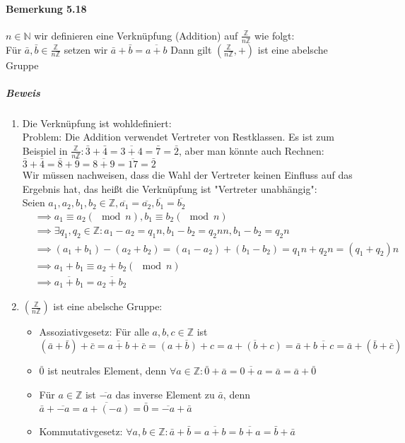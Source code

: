 \documentclass[a4paper]{scrartcl}
\DeclareMathOperator{\Forall}{\forall}
\theoremstyle{definition}
\theoremstyle{plain}
\theoremstyle{plain}
\theoremstyle{remark}
\theoremstyle{remark}
\theoremstyle{remark}
\theoremstyle{remark}
\theoremstyle{remark}
\begin{document}
\paragraph{Bemerkung 5.18}
\label{sec-3-1-7-4}
$n\in\mathbb{N}$ wir definieren eine Verknüpfung (Addition) auf $\frac{\mathbb{Z}}{n\mathbb{Z}}$ wie folgt: \\
     Für $\bar a,\bar b \in\frac{\mathbb{Z}}{n\mathbb{Z}}$ setzen wir $\bar a + \bar b = \overline{a + b}$
Dann gilt $(\frac{\mathbb{Z}}{n\mathbb{Z}},+)$ ist eine abelsche Gruppe
\subparagraph{Beweis}
\label{sec-3-1-7-4-1}
\begin{enumerate}
\item Die Verknüpfung ist wohldefiniert: \\ Problem: Die Addition verwendet Vertreter von Restklassen. Es ist zum Beispiel in $\frac{\mathbb{Z}}{n\mathbb{Z}}: \bar 3 + \bar 4 = \overline{3 + 4} = \bar 7 = \bar 2$, aber man könnte auch Rechnen:
$\bar 3 + \bar 4 = \bar 8 + \bar 9 = \overline{8 + 9} = \overline{17} = \bar 2$ \\
         Wir müssen nachweisen, dass die Wahl der Vertreter keinen Einfluss auf das Ergebnis hat, das heißt die Verknüpfung ist "Vertreter unabhängig": \\
         Seien $a_1,a_2 ,b_1,b_2 \in\mathbb{Z},\overline{a_1} = \overline{a_2},\overline{b_1} = \overline{b_2}$
\begin{align}
&\implies a_1 \equiv a_2(\mod n), b_1 \equiv b_2(\mod n) \\
&\implies\exists q_1,q_2\in\mathbb{Z}: a_1 - a_2 = q_1 n, b_1 - b_2 = q_2 n n, b_1 - b_2 = q_2 n \\
&\implies (a_1 + b_1) - (a_2 + b_2) = (a_1 - a_2)+ (b_1 - b_2) = q_1 n + q_2 n = (q_1 + q_2) n \\
&\implies a_1 + b_ 1 \equiv a_2 + b_2 (\mod n) \\
&\implies \overline{a_1 + b_1} = \overline{a_2 + b_2}
\end{align}
\item $(\frac{\mathbb{Z}}{n\mathbb{Z}})$ ist eine abelsche Gruppe:
\begin{itemize}
\item Assoziativgesetz: Für alle $a,b,c\in\mathbb{Z}$ ist
\[(\bar a + \bar b) + \bar c = \overline{a + b} + \bar c = \overline{(a + b) + c} = \overline{a + (b + c)} = \bar a + \overline{b + c} = \bar a + (\bar b + \bar c)\]
\item $\bar 0$ ist neutrales Element, denn $\Forall a\in\mathbb{Z}:\bar 0 + \bar a = \overline{0 + a} = \bar a = \bar a + \bar 0$
\item Für $a\in\mathbb{Z}$ ist $\overline{-a}$ das inverse Element zu $\bar a$, denn $\bar a + \overline{-a} = \overline{a + (- a)} = \bar 0 = \overline{-a} + \bar a$
\item Kommutativgesetz: $\Forall a,b\in\mathbb{Z}:\bar a + \bar b = \overline{a + b} = \overline{b + a} = \bar b + \bar a$
\end{itemize}
\end{enumerate}
\end{document}
